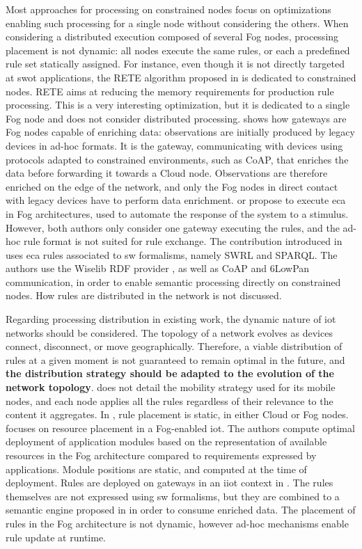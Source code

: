 \documentclass[sw]{iosart2x}
\begin{document}
Most approaches for processing on constrained nodes focus on optimizations enabling such processing for a single node without considering the others.
When considering a distributed execution composed of several Fog nodes, processing placement is not dynamic: all nodes execute the same rules, or each a predefined rule set statically assigned.
For instance, even though it is not directly targeted at \gls{swot} applications, the RETE algorithm proposed in \cite{Woensel2018} is dedicated to constrained nodes.
RETE aims at reducing the memory requirements for production rule processing.
This is a very interesting optimization, but it is dedicated to a single Fog node and does not consider distributed processing.
\cite{Desai2015} shows how gateways are Fog nodes capable of enriching data: observations are initially produced by legacy devices in ad-hoc formats. 
It is the gateway, communicating with devices using protocols adapted to constrained environments, such as CoAP, that enriches the data before forwarding it towards a Cloud node. 
Observations are therefore enriched on the edge of the network, and only the Fog nodes in direct contact with legacy devices have to perform data enrichment.
\cite{Lee2016} or \cite{KaedKBHS18} propose to execute \gls{eca} in Fog architectures, used to automate the response of the system to a stimulus. 
However, both authors only consider one gateway executing the rules, and the ad-hoc rule format is not suited for rule exchange.
The contribution introduced in \cite{IoannisChatzigiannakis129} uses \gls{eca} rules associated to \gls{sw} formalisms, namely SWRL and SPARQL.
The authors use the Wiselib RDF provider \cite{Hasemann2012}, as well as CoAP and 6LowPan communication, in order to enable semantic processing directly on constrained nodes.
How rules are distributed in the network is not discussed.

Regarding processing distribution in existing work, the dynamic nature of \gls{iot} networks should be considered. 
The topology of a network evolves as devices connect, disconnect, or move geographically.
Therefore, a viable distribution of rules at a given moment is not guaranteed to remain optimal in the future, and \textbf{the distribution strategy should be adapted to the evolution of the network topology}.
\cite{Maarala2017} does not detail the mobility strategy used for its mobile nodes, and each node applies all the rules regardless of their relevance to the content it aggregates.
In \cite{Su2018}, rule placement is static, in either Cloud or Fog nodes. 
\cite{Taneja2017} focuses on resource placement in a Fog-enabled \gls{iot}. 
The authors compute optimal deployment of application modules based on the representation of available resources in the Fog architecture compared to requirements expressed by applications. 
Module positions are static, and computed at the time of deployment.
Rules are deployed on gateways in an \gls{iiot} context in \cite{Kaed2018}.
The rules themselves are not expressed using \gls{sw} formalisms, but they are combined to a semantic engine proposed in \cite{Kaed2016} in order to consume enriched data.
The placement of rules in the Fog architecture is not dynamic, however ad-hoc mechanisms enable rule update at runtime.
\end{document}
